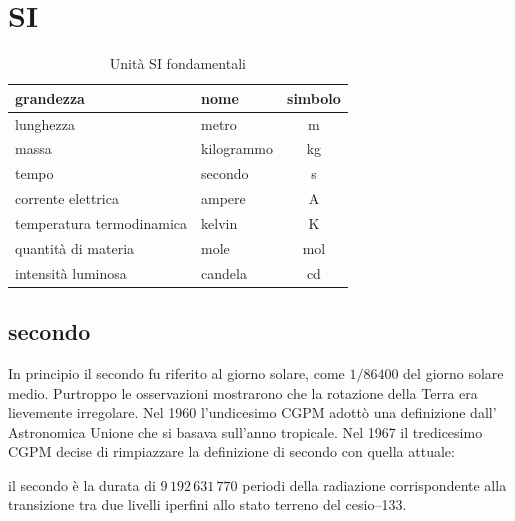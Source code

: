\section{SI}
\begin{table}[ht]
  \centering
  \begin{tabular}{llc}
    \toprule
    grandezza                 & nome       & simbolo        \\
    \midrule
    lunghezza                 & metro      & \si{\meter}    \\
    massa                     & kilogrammo & \si{\kilogram} \\
    tempo                     & secondo    & \si{\second}   \\
    corrente elettrica        & ampere     & \si{\ampere}   \\
    temperatura termodinamica & kelvin     & \si{\kelvin}   \\
    quantità di materia       & mole       & \si{\mole}     \\
    intensità luminosa        & candela    & \si{\candela}  \\
    \bottomrule
  \end{tabular}
  \caption{Unità SI fondamentali}
\end{table}
\subsection{secondo}
In principio il secondo fu riferito al giorno solare, come $1/86400$ del giorno solare medio. Purtroppo le osservazioni mostrarono che la rotazione della Terra era lievemente irregolare. Nel 1960 l'undicesimo CGPM adottò una definizione dall' Astronomica Unione che si basava sull'anno tropicale. Nel 1967 il tredicesimo CGPM decise di rimpiazzare la definizione di secondo con quella attuale:
\begin{definizioneunita}
  il secondo è la durata di ${9\,192\,631\,770}$ periodi della radiazione corrispondente alla transizione tra due livelli iperfini allo stato terreno del cesio--133.
\end{definizioneunita}
